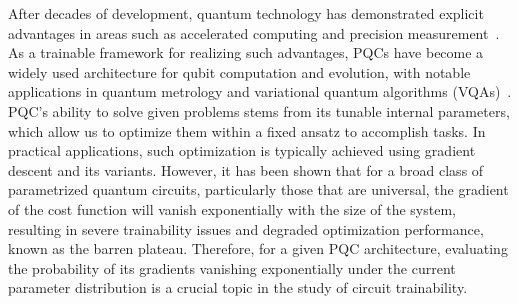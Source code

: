 \documentclass[%
 reprint,
 superscriptaddress,
 amsmath,amssymb,
 aps, prl, twocolumn, showpacs,
]{revtex4-2}
\begin{document}
\maketitle


After decades of development, quantum technology has demonstrated explicit advantages in areas such as accelerated computing and precision measurement~\cite{daley2022practical, huang2022quantum, bravyi2018quantum, lee2023evaluating, arvidsson2020quantum}. As a trainable framework for realizing such advantages, PQCs have become a widely used architecture for qubit computation and evolution, with notable applications in quantum metrology \cite{liu2024optimal,munoz2024photonic,de2025improving,yang2025programmable} and variational quantum algorithms (VQAs)~\cite{haug2022natural,miao2024neural,tilly2022variational,wu2023quantumdarts}. PQC's ability to solve given problems stems from its tunable internal parameters, which allow us to optimize them within a fixed ansatz to accomplish tasks. In practical applications, such optimization is typically achieved using gradient descent and its variants. However, it has been shown that for a broad class of parametrized quantum circuits, particularly those that are universal, the gradient of the cost function will vanish exponentially with the size of the system\cite{holmes2022connecting,gong2024enhancing}, resulting in severe trainability issues and degraded optimization performance, known as the barren plateau. Therefore, for a given PQC architecture, evaluating the probability of its gradients vanishing exponentially under the current parameter distribution is a crucial topic in the study of circuit trainability.
\end{document}
